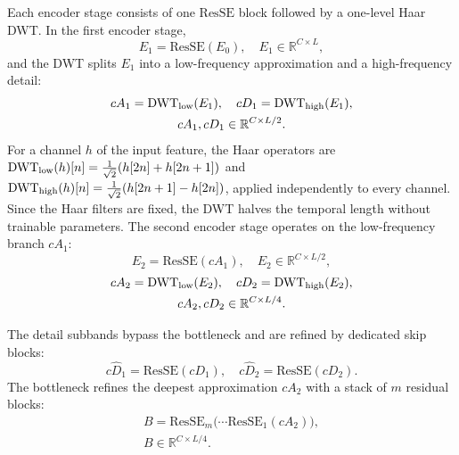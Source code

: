 Each encoder stage consists of one $\mathrm{ResSE}$ block followed by a one-level Haar DWT. In the first encoder stage,
\begin{equation}
E_1 = \mathrm{ResSE}(E_0), \quad E_1 \in \mathbb{R}^{C \times L},
\end{equation}
and the DWT splits $E_1$ into a low-frequency approximation and a high-frequency detail:
\begin{equation}
\begin{gathered}
cA_1 = \mathrm{DWT}_{\mathrm{low}}(E_1), \quad cD_1 = \mathrm{DWT}_{\mathrm{high}}(E_1), \\
cA_1, cD_1 \in \mathbb{R}^{C \times L/2}.
\end{gathered}
\end{equation}
For a channel $h$ of the input feature, the Haar operators are $\mathrm{DWT}_{\mathrm{low}}(h)[n] = \frac{1}{\sqrt{2}}(h[2n] + h[2n+1])$ and $\mathrm{DWT}_{\mathrm{high}}(h)[n] = \frac{1}{\sqrt{2}}(h[2n+1] - h[2n])$, applied independently to every channel. Since the Haar filters are fixed, the DWT halves the temporal length without trainable parameters. The second encoder stage operates on the low-frequency branch $cA_1$:
\begin{equation}
E_2 = \mathrm{ResSE}(cA_1), \quad E_2 \in \mathbb{R}^{C \times L/2},
\end{equation}
\begin{equation}
\begin{gathered}
cA_2 = \mathrm{DWT}_{\mathrm{low}}(E_2), \quad cD_2 = \mathrm{DWT}_{\mathrm{high}}(E_2), \\
cA_2, cD_2 \in \mathbb{R}^{C \times L/4}.
\end{gathered}
\end{equation}

The detail subbands bypass the bottleneck and are refined by dedicated skip blocks:
\begin{equation}
c\hat{D}_1 = \mathrm{ResSE}(cD_1), \quad c\hat{D}_2 = \mathrm{ResSE}(cD_2).
\end{equation}
The bottleneck refines the deepest approximation $cA_2$ with a stack of $m$ residual blocks:
\begin{equation}
\begin{gathered}
B = \mathrm{ResSE}_m\big(\cdots \mathrm{ResSE}_1(cA_2)\big), \\
B \in \mathbb{R}^{C \times L/4}.
\end{gathered}
\end{equation}

